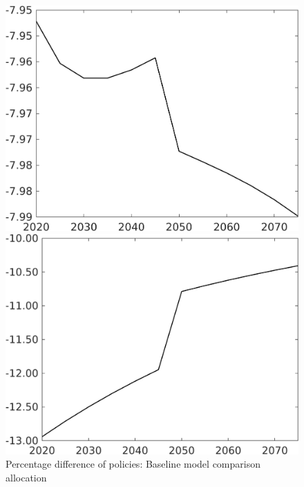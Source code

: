 \documentclass[12pt]{article}
\begin{document}
\begin{figure}[h!!]
	\centering
	\caption{Percentage difference of policies: Baseline model comparison allocation}\label{fig:Pertauf_nsk0_xgr02}
	
	\begin{minipage}[]{0.32\textwidth}
		\includegraphics[width=1\textwidth]{../../codding_model/own_basedOnFried/optimalPol_010922_revision/figures/all_13Sept22/CompTaufPER_bytaul_Reg0_N_spillover0_nsk0_xgr0_knspil0_sep1_LFlimit1_emsbase0_countec0_GovRev0_etaa0.79_lgd0.png}
	\end{minipage}	
\begin{minipage}[]{0.32\textwidth}
\includegraphics[width=1\textwidth]{../../codding_model/own_basedOnFried/optimalPol_010922_revision/figures/all_13Sept22/CompTaufPER_bytaul_Reg0_G_spillover0_nsk0_xgr0_knspil0_sep1_LFlimit1_emsbase0_countec0_GovRev0_etaa0.79_lgd0.png}

\end{minipage}
\end{figure}
\end{document}
